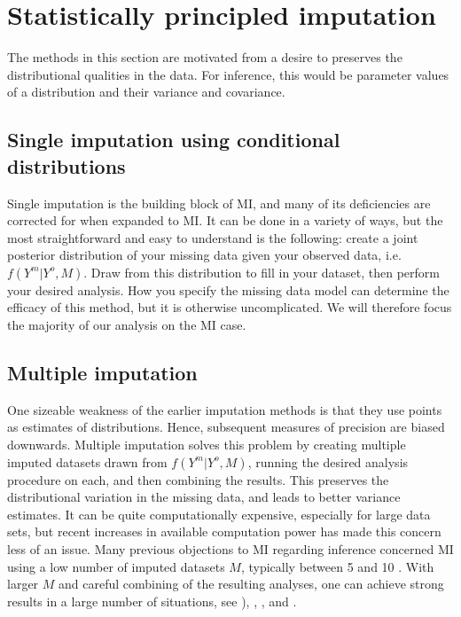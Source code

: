 \documentclass{article}
\begin{document}
	\section{Statistically principled imputation}
	The methods in this section are motivated from a desire to preserves the distributional qualities in the data. For inference, this would be parameter values of a distribution and their variance and covariance. 
	
	
	\subsection{Single imputation using conditional distributions}
	Single imputation is the building block of MI, and many of its deficiencies are corrected for when expanded to MI. It can be done in a variety of ways, but the most straightforward and easy to understand is the following: create a joint posterior distribution of your missing data given your observed data, i.e. $f(Y^{m}|Y^{o}, M)$. Draw from this distribution to fill in your dataset, then perform your desired analysis. How you specify the missing data model can determine the efficacy of this method, but it is otherwise uncomplicated. We will therefore focus the majority of our analysis on the MI case.
	
	\subsection{Multiple imputation}
	One sizeable weakness of the earlier imputation methods is that they use points as estimates of distributions. Hence, subsequent measures of precision are biased downwards. Multiple imputation solves this problem by creating multiple imputed datasets drawn from $f(Y^{m}|Y^{o}, M)$, running the desired analysis procedure on each, and then combining the results. This preserves the distributional variation in the missing data, and leads to better variance estimates. It can be quite computationally expensive, especially for large data sets, but recent increases in available computation power has made this concern less of an issue. Many previous objections to MI regarding inference concerned MI using a low number of imputed datasets $M$, typically between 5 and 10 \cite{Meng1994}. With larger $M$ and careful combining of the resulting analyses, one can achieve strong results in a large number of situations, see \cite{Xie2017}), \cite{Meng1994}, \cite{rubin_multiple_1996}, and \cite{madley-dowd_proportion_2019}.
	
\end{document}
